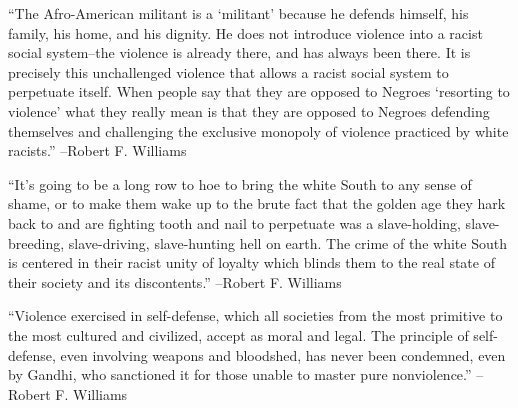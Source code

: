\documentclass{article}%
\begin{document}
\linebreak%
\vspace{1mm}%
\begin{minipage}{\textwidth}%
\flushleft%
“The Afro{-}American militant is a ‘militant’ because he defends himself, his family, his home, and his dignity. He does not introduce violence into a racist social system–the violence is already there, and has always been there. It is precisely this unchallenged violence that allows a racist social system to perpetuate itself. When people say that they are opposed to Negroes ‘resorting to violence’ what they really mean is that they are opposed to Negroes defending themselves and challenging the exclusive monopoly of violence practiced by white racists.”%
\linebreak%
\vspace{1mm}%
–Robert F. Williams%
\linebreak%
\vspace{1mm}%
\end{minipage}%
\linebreak%
\vspace{1mm}%
\begin{minipage}{\textwidth}%
\flushleft%
“It's going to be a long row to hoe to bring the white South to any sense of shame, or to make them wake up to the brute fact that the golden age they hark back to and are fighting tooth and nail to perpetuate was a slave{-}holding, slave{-}breeding, slave{-}driving, slave{-}hunting hell on earth. The crime of the white South is centered in their racist unity of loyalty which blinds them to the real state of their society and its discontents.”%
\linebreak%
\vspace{1mm}%
–Robert F. Williams%
\linebreak%
\vspace{1mm}%
\end{minipage}%
\linebreak%
\vspace{1mm}%
\begin{minipage}{\textwidth}%
\flushleft%
“Violence exercised in self{-}defense, which all societies from the most primitive to the most cultured and civilized, accept as moral and legal. The principle of self{-}defense, even involving weapons and bloodshed, has never been condemned, even by Gandhi, who sanctioned it for those unable to master pure nonviolence.”%
\linebreak%
\vspace{1mm}%
–Robert F. Williams%
\linebreak%
\vspace{1mm}%
\end{minipage}%
\end{document}
